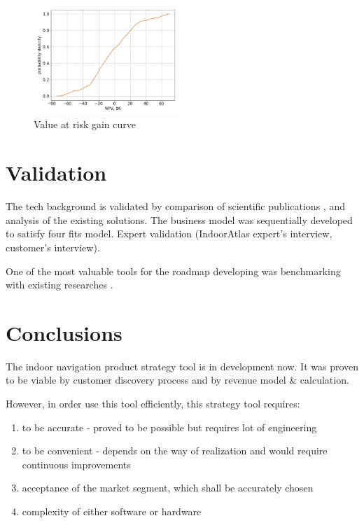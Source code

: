 

\begin{figure}
	\includegraphics[width=0.49\textwidth]{graphics/roadmap/fin/varg_mruns.png}
	\caption{Value at risk gain curve}
	\label{fig:varg}
\end{figure}

\section{Validation}


The tech background is validated by comparison of scientific publications \cite{ILA-System-Architecture}, \cite{Brena2017, Kj_fingerprinting, Li_geomagnetic, Mautz2012IndoorPT, AI-Centric_IPS} and analysis of the existing solutions.
The business model was sequentially developed to satisfy four fits model.
Expert validation (IndoorAtlas expert's interview, customer's interview).

One of the most valuable tools for the roadmap developing was benchmarking with existing researches \cite{microsoft}.

\section{Conclusions}

The indoor navigation product strategy tool is in development now.
It was proven to be viable by customer discovery process and by revenue model \& calculation.

However, in order use this tool efficiently, this strategy tool requires:
\begin{enumerate}
	\item to be accurate - proved to be possible but requires lot of engineering
	\item to be convenient - depends on the way of realization and would require continuous improvements
	\item acceptance of the market segment, which shall be accurately chosen
	\item complexity of either software or hardware
\end{enumerate}

